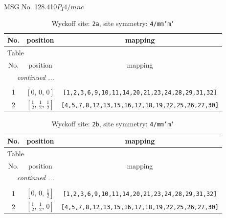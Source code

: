 \documentclass[fleqn,8pt]{jsarticle}
\begin{document}
\setcounter{MaxMatrixCols}{32}

\renewcommand{\tablename}{Table~}
\renewcommand{\figurename}{Figure~}
\begin{center}
\LARGE
MSG No. 128.410\quad$P_{I}4/mnc$
\end{center}
\renewcommand{\arraystretch}{1.2}
\begin{longtable}{ccc}
\caption{Wyckoff site: {\tt 2a}, site symmetry: {\tt 4/mm'm'}}
 \\
 \hline \hline
No. & position & mapping \\ \hline \endfirsthead

\multicolumn{2}{l}{\tablename\ \thetable{}} \\
 \hline \hline
No. & position & mapping \\ \hline \endhead

 \hline \hline
\multicolumn{2}{r}{\footnotesize\it continued ...} \\ \endfoot

 \hline \hline
\multicolumn{2}{r}{} \\ \endlastfoot

1 & $\left[ 0,\, 0,\, 0 \right]$ & {\tt [1,2,3,6,9,10,11,14,20,21,23,24,28,29,31,32]} \\ \hline
2 & $\left[ \frac{1}{2},\, \frac{1}{2},\, \frac{1}{2} \right]$ & {\tt [4,5,7,8,12,13,15,16,17,18,19,22,25,26,27,30]} \\
\end{longtable}
\renewcommand{\arraystretch}{1.2}
\begin{longtable}{ccc}
\caption{Wyckoff site: {\tt 2b}, site symmetry: {\tt 4/mm'm'}}
 \\
 \hline \hline
No. & position & mapping \\ \hline \endfirsthead

\multicolumn{2}{l}{\tablename\ \thetable{}} \\
 \hline \hline
No. & position & mapping \\ \hline \endhead

 \hline \hline
\multicolumn{2}{r}{\footnotesize\it continued ...} \\ \endfoot

 \hline \hline
\multicolumn{2}{r}{} \\ \endlastfoot

1 & $\left[ 0,\, 0,\, \frac{1}{2} \right]$ & {\tt [1,2,3,6,9,10,11,14,20,21,23,24,28,29,31,32]} \\ \hline
2 & $\left[ \frac{1}{2},\, \frac{1}{2},\, 0 \right]$ & {\tt [4,5,7,8,12,13,15,16,17,18,19,22,25,26,27,30]} \\
\end{longtable}
\end{document}
